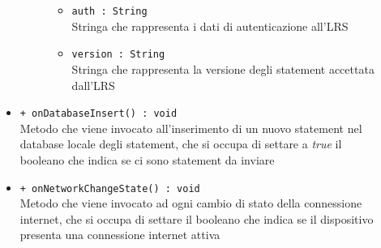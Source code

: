 \documentclass[../Tesi.tex]{subfiles}
\begin{document}
\begin{description}
\begin{itemize}
\begin{description}
\begin{itemize}
						\item \texttt{auth : String}\\
						Stringa che rappresenta i dati di autenticazione all'LRS

						\item \texttt{version : String}\\
						Stringa che rappresenta la versione degli statement accettata dall'LRS
					\end{itemize}
				\end{description}

				\item \texttt{+ onDatabaseInsert() : void}\\
				Metodo che viene invocato all'inserimento di un nuovo statement nel database locale degli statement, che si occupa di settare a \textit{true} il booleano che indica se ci sono statement da inviare

				\item \texttt{+ onNetworkChangeState() : void}\\
				Metodo che viene invocato ad ogni cambio di stato della connessione internet, che si occupa di settare il booleano che indica se il dispositivo presenta una connessione internet attiva

			\end{itemize}
		\end{description}
\end{document}
